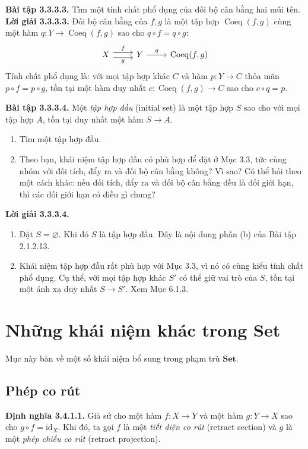 \noindent\textbf{Bài tập 3.3.3.3.} Tìm một tính chất phổ dụng của đối bộ cân bằng hai mũi tên.
\noindent\textbf{Lời giải 3.3.3.3.} Đối bộ cân bằng của $f,g$ là một tập hợp $\operatorname{Coeq}(f,g)$ cùng một hàm $q:Y\to\operatorname{Coeq}(f,g)$ sao cho $q\circ f=q\circ g$:
\[\begin{tikzcd}X\arrow[r,shift left=.7ex,"f"]\arrow[r,shift right=.7ex,"g"']&Y\arrow[r,"q"]&\operatorname{Coeq}(f,g)\end{tikzcd}\]
Tính chất phổ dụng là: với mọi tập hợp khác $C$ và hàm $p:Y\to C$ thỏa mãn $p\circ f=p\circ g$, tồn tại một hàm duy nhất $c:\operatorname{Coeq}(f,g)\to C$ sao cho $c\circ q=p$.

\noindent\textbf{Bài tập 3.3.3.4.} Một \emph{tập hợp đầu} (initial set) là một tập hợp $S$ sao cho với mọi tập hợp $A$, tồn tại duy nhất một hàm $S\to A$.
\begin{enumerate}[label=\alph*.]
\item Tìm một tập hợp đầu.
\item Theo bạn, khái niệm tập hợp đầu có phù hợp để đặt ở Mục 3.3, tức cùng nhóm với đối tích, đẩy ra và đối bộ cân bằng không? Vì sao? Có thể hỏi theo một cách khác: nếu đối tích, đẩy ra và đối bộ cân bằng đều là đối giới hạn, thì các đối giới hạn có điều gì chung?
\end{enumerate}

\noindent\textbf{Lời giải 3.3.3.4.}\keepwithnext
\begin{enumerate}[label=\alph*.]
\item Đặt $S=\varnothing$. Khi đó $S$ là tập hợp đầu. Đây là nội dung phần (b) của Bài tập 2.1.2.13.
\item Khái niệm tập hợp đầu rất phù hợp với Mục 3.3, vì nó có cùng kiểu tính chất phổ dụng. Cụ thể, với mọi tập hợp khác $S'$ có thể giữ vai trò của $S$, tồn tại một ánh xạ duy nhất $S\to S'$. Xem Mục 6.1.3.
\end{enumerate}

\section{Những khái niệm khác trong \textbf{Set}}
Mục này bàn về một số khái niệm bổ sung trong phạm trù $\mathbf{Set}$.

\subsection{Phép co rút}
\noindent\textbf{Định nghĩa 3.4.1.1.} Giả sử cho một hàm $f:X\to Y$ và một hàm $g:Y\to X$ sao cho $g\circ f=\mathrm{id}_X$. Khi đó, ta gọi $f$ là một \emph{tiết diện co rút} (retract section) và $g$ là một \emph{phép chiếu co rút} (retract projection).


